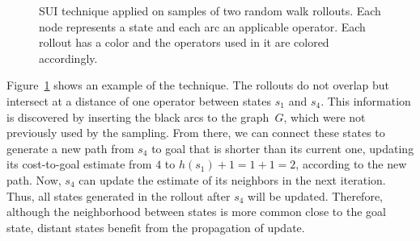 \begin{figure}[ht]
    \caption[SUI technique applied on samples of random walk rollouts.]{SUI technique applied on samples of two random walk rollouts. Each node represents a state and each arc an applicable operator. Each rollout has a color and the operators used in it are colored accordingly.}
    \label{fig:sui}
    \addvspace{\baselineskip}
    \centering
\end{figure}

Figure~\ref{fig:sui} shows an example of the technique. The rollouts do not overlap but intersect at a distance of one operator between states $s_1$ and $s_4$. This information is discovered by inserting the black arcs to the graph~$G$, which were not previously used by the sampling. From there, we can connect these states to generate a new path from $s_4$ to goal that is shorter than its current one, updating its cost-to-goal estimate from $4$ to $h(s_1)+1=1+1=2$, according to the new path. Now, $s_4$ can update the estimate of its neighbors in the next iteration. Thus, all states generated in the rollout after $s_4$ will be updated. Therefore, although the neighborhood between states is more common close to the goal state, distant states benefit from the propagation of update.

